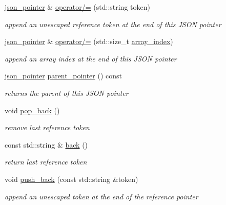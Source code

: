 \begin{DoxyCompactItemize}
\mbox{\hyperlink{classnlohmann_1_1json__pointer}{json\+\_\+pointer}} \& \mbox{\hyperlink{classnlohmann_1_1json__pointer_abdd21567b2b1d69329af0f520335e68b}{operator/=}} (std\+::string token)
\begin{DoxyCompactList}\small\item\em append an unescaped reference token at the end of this J\+S\+ON pointer \end{DoxyCompactList}\item 
\mbox{\hyperlink{classnlohmann_1_1json__pointer}{json\+\_\+pointer}} \& \mbox{\hyperlink{classnlohmann_1_1json__pointer_a64c8401529131bad1e486d91d703795f}{operator/=}} (std\+::size\+\_\+t \mbox{\hyperlink{classnlohmann_1_1json__pointer_ac53f5b79dd91da78743c437832f57ce4}{array\+\_\+index}})
\begin{DoxyCompactList}\small\item\em append an array index at the end of this J\+S\+ON pointer \end{DoxyCompactList}\item 
\mbox{\hyperlink{classnlohmann_1_1json__pointer}{json\+\_\+pointer}} \mbox{\hyperlink{classnlohmann_1_1json__pointer_afdaacce1edb7145e0434e014f0e8685a}{parent\+\_\+pointer}} () const
\begin{DoxyCompactList}\small\item\em returns the parent of this J\+S\+ON pointer \end{DoxyCompactList}\item 
void \mbox{\hyperlink{classnlohmann_1_1json__pointer_a4b1ee4d511ca195bed896a3da47e264c}{pop\+\_\+back}} ()
\begin{DoxyCompactList}\small\item\em remove last reference token \end{DoxyCompactList}\item 
const std\+::string \& \mbox{\hyperlink{classnlohmann_1_1json__pointer_a6bd5b554c10f15672135c216893eef31}{back}} ()
\begin{DoxyCompactList}\small\item\em return last reference token \end{DoxyCompactList}\item 
void \mbox{\hyperlink{classnlohmann_1_1json__pointer_a697d12b5bd6205f8866691b166b7c7dc}{push\+\_\+back}} (const std\+::string \&token)
\begin{DoxyCompactList}\small\item\em append an unescaped token at the end of the reference pointer \end{DoxyCompactList}\item 

\end{DoxyCompactItemize}
